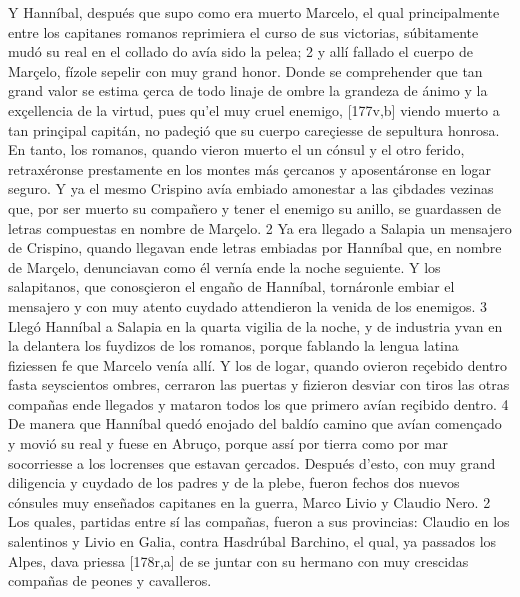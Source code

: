 \documentclass[11pt,twoside]{article}\makeatletter
\def\persName{}\def\name{}
\begin{document}
\pend
{} Y  {\persName Hanníbal}, después que supo como era muerto Marcelo, el qual principalmente entre los capitanes romanos reprimiera el curso de sus victorias, súbitamente mudó su real en el collado do avía sido la pelea; 2 y allí fallado el cuerpo de Marçelo, fízole sepelir con muy grand honor. Donde se  comprehender que tan grand valor se estima çerca de todo linaje de ombre la grandeza de ánimo y la exçellencia de la virtud, pues qu’el muy cruel enemigo, %
[177v,b] viendo muerto a tan prinçipal capitán, no padeçió que su cuerpo careçiesse de sepultura honrosa.
\pend
{} En tanto, los romanos, quando vieron muerto el un cónsul y el otro ferido, retraxéronse prestamente en los montes más çercanos y aposentáronse en logar seguro. Y ya el mesmo Crispino avía embiado amonestar a las çibdades vezinas que, por ser muerto su compañero y tener el enemigo su anillo, se guardassen de letras compuestas en nombre de Marçelo. 2 Ya era llegado a Salapia un mensajero de Crispino, quando llegavan ende letras embiadas por  {\persName Hanníbal} que, en nombre de Marçelo, denunciavan como él vernía ende la noche seguiente. Y los salapitanos, que conosçieron el engaño de  {\persName Hanníbal}, tornáronle embiar el mensajero y con muy atento cuydado attendieron la venida de los enemigos. 3 Llegó  {\persName Hanníbal} a Salapia en la quarta vigilia de la noche, y de industria yvan en la delantera los fuydizos de los romanos, porque fablando la lengua latina fiziessen fe que Marcelo venía allí. Y los de logar, quando ovieron reçebido dentro fasta seyscientos ombres, cerraron las puertas y fizieron desviar con tiros las otras compañas ende llegados y mataron todos los que primero avían reçibido dentro. 4 De manera que  {\persName Hanníbal} quedó enojado del baldío camino que avían començado y movió su real y fuese en Abruço, porque assí por tierra como por mar socorriesse a los locrenses que estavan çercados.
\pend
{} Después d’esto, con muy grand diligencia y cuydado de los padres y de la plebe, fueron fechos dos nuevos cónsules muy enseñados capitanes en la guerra, Marco  {\persName Livio} y Claudio Nero. 2 Los quales, partidas entre sí las compañas, fueron a sus provincias: Claudio en los salentinos y  {\persName Livio} en Galia, contra  {\persName Hasdrúbal} Barchino, el qual, ya passados los Alpes, dava priessa %
[178r,a] de se juntar con su hermano con muy crescidas compañas de peones y cavalleros.
\pend
\pstart
\end{document}
